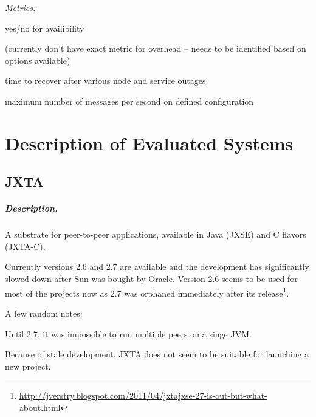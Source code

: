 \documentclass[a4paper]{report}
\newenvironment{metrics}{\par\emph{Metrics:}\begin{compactitem}}{\end{compactitem}}
\begin{document}
\begin{metrics}

\item yes/no for availibility

\item (currently don't have exact metric for overhead -- needs to be identified
based on options available)

\item time to recover after various node and service outages 

\item maximum number of messages per second on defined configuration

\end{metrics}







\chapter{Description of Evaluated Systems}

\section{JXTA}

\paragraph{Description.}

A substrate for peer-to-peer applications, available in Java (JXSE) and C
flavors (JXTA-C).

Currently versions 2.6 and 2.7 are available and the development has
significantly slowed down after Sun was bought by Oracle.  Version 2.6 seems to
be used for most of the projects now as 2.7 was orphaned immediately after its
release\footnote{\url{http://jverstry.blogspot.com/2011/04/jxtajxse-27-is-out-but-what-about.html}}.

A few random notes:

\begin{compactitem}

\item Until 2.7, it was impossible to run multiple peers on a singe JVM.

\item Because of stale development, JXTA does not seem to be suitable for
launching a new project.

\end{compactitem}
\end{document}
